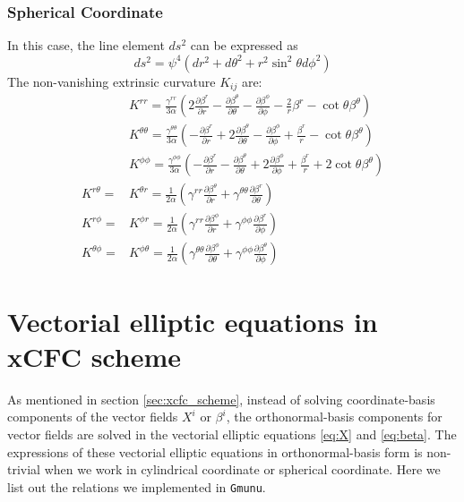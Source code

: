 \subsubsection*{Spherical Coordinate}
In this case, the line element $ds^2$ can be expressed as
\begin{equation}
 ds^2 = \psi^4 ( dr^2 + d\theta^2 + r^2 \sin^2 \theta d\phi^2 )
\end{equation}
The non-vanishing extrinsic curvature $K_{ij}$ are:
\begin{align}
	&K^{rr} = \frac{\gamma^{rr}}{3 \alpha} \left( 2 \frac{\partial \beta^r}{\partial r}  - \frac{\partial \beta^\theta}{\partial \theta} - \frac{\partial \beta^\phi }{\partial \phi} - \frac{2}{r}\beta^r - \cot \theta \beta^\theta \right) \\
	&K^{\theta\theta} = \frac{\gamma^{\theta\theta}}{3 \alpha} \left( - \frac{\partial \beta^r}{\partial r} + 2 \frac{\partial \beta^\theta}{\partial \theta} - \frac{\partial \beta^\phi }{\partial \phi} + \frac{\beta^r}{r} - \cot \theta \beta^\theta \right) \\
	&K^{\phi \phi} = \frac{\gamma^{\phi \phi}}{3 \alpha} \left( - \frac{\partial  \beta^r}{\partial r} - \frac{\partial \beta^\theta }{\partial \theta} + 2 \frac{\partial \beta^\phi}{\partial \phi}  + \frac{\beta^r}{r}  + 2 \cot \theta \beta^\theta \right) \\
	K^{r\theta} = &K^{\theta r} = \frac{1}{2 \alpha} \left( \gamma^{rr} \frac{\partial  \beta^\theta}{\partial r} + \gamma^{\theta\theta} \frac{\partial  \beta^r}{\partial \theta} \right) \\
	K^{r\phi} = &K^{\phi r} = \frac{1}{2 \alpha} \left( \gamma^{rr} \frac{\partial \beta^\phi }{\partial r} + \gamma^{\phi \phi} \frac{\partial \beta^r}{\partial \phi}  \right) \\
	K^{\theta\phi} = &K^{\phi\theta} = \frac{1}{2 \alpha} \left( \gamma^{\theta\theta} \frac{\partial \beta^\phi }{\partial \theta} + \gamma^{\phi \phi} \frac{\partial \beta^\theta}{\partial \phi}  \right) 
\end{align}


\section{\label{appendix:vector_laplician}Vectorial elliptic equations in xCFC scheme}
As mentioned in section \ref{sec:xcfc_scheme}, instead of solving coordinate-basis components of the vector fields $X^i$ or $\beta^i$, the orthonormal-basis components for vector fields are solved in the vectorial elliptic equations \eqref{eq:X} and \eqref{eq:beta}.
The expressions of these vectorial elliptic equations in orthonormal-basis form is non-trivial when we work in cylindrical coordinate or spherical coordinate.
Here we list out the relations we implemented in \texttt{Gmunu}.

